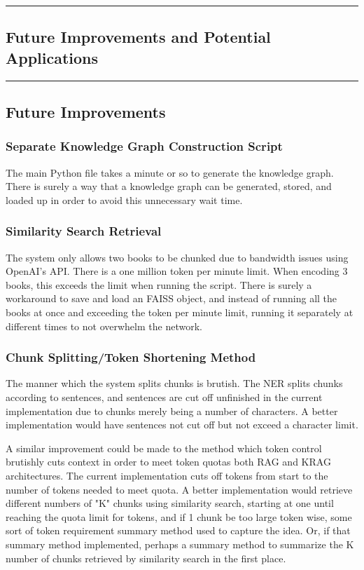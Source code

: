 {\color{gray}\hrule}
\begin{center}
\section{Future Improvements and Potential Applications}
\bigskip
\end{center}
{\color{gray}\hrule}

\subsection{Future Improvements}
\subsubsection{Separate Knowledge Graph Construction Script}
The main Python file takes a minute or so to generate the knowledge graph. There is surely a way that a knowledge graph can be generated, stored, and loaded up in order to avoid this unnecessary wait time.

\subsubsection{Similarity Search Retrieval}
The system only allows two books to be chunked due to bandwidth issues using OpenAI's API. There is a one million token per minute limit. When encoding 3 books, this exceeds the limit when running the script. There is surely a workaround to save and load an FAISS object, and instead of running all the books at once and exceeding the token per minute limit, running it separately at different times to not overwhelm the network.

\subsubsection{Chunk Splitting/Token Shortening Method}
The manner which the system splits chunks is brutish. The NER splits chunks according to sentences, and sentences are cut off unfinished in the current implementation due to chunks merely being a number of characters. A better implementation would have sentences not cut off but not exceed a character limit.
\par

A similar improvement could be made to the method which token control brutishly cuts context in order to meet token quotas both RAG and KRAG architectures. The current implementation cuts off tokens from start to the number of tokens needed to meet quota. A better implementation would retrieve different numbers of "K" chunks using similarity search, starting at one until reaching the quota limit for tokens, and if 1 chunk be too large token wise, some sort of token requirement summary method used to capture the idea. Or, if that summary method implemented, perhaps a summary method to summarize the K number of chunks retrieved by similarity search in the first place.

